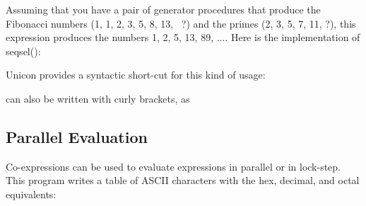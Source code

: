 
Assuming that you have a pair of generator procedures
that produce the Fibonacci numbers (1, 1, 2, 3, 5, 8, 13, \ ?) and the
primes (2, 3, 5, 7, 11, ?), this expression produces the numbers 1, 2,
5, 13, 89, .... Here is the implementation of \textsf{seqsel()}:


Unicon provides a syntactic short-cut for this kind of usage:


\noindent
can also be written with curly brackets, as


\subsection[Parallel Evaluation]{Parallel Evaluation}

Co-expressions can be used to evaluate
expressions {\textquotedbl}in parallel{\textquotedbl} or in lock-step.
This program writes a table of ASCII characters with the
hex, decimal, and octal equivalents:

